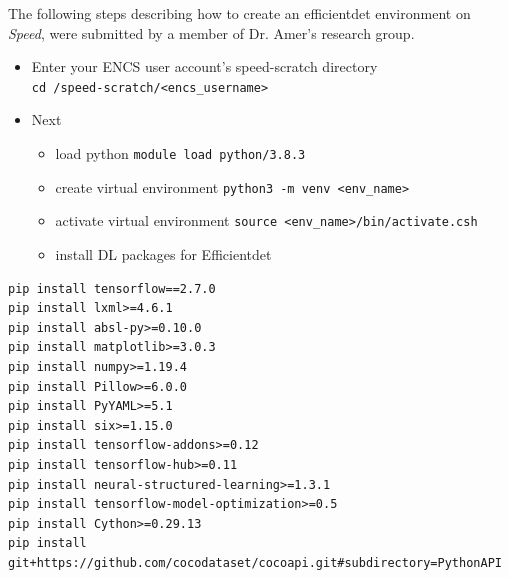 The following steps describing how to create an efficientdet environment on
\emph{Speed}, were submitted by a member of Dr. Amer's research group.

\begin{itemize}
    \item 
    Enter your ENCS user account's speed-scratch directory\\ 
    \verb!cd /speed-scratch/<encs_username>!
    \item
		Next
		\begin{itemize}
			\item 
    load python \verb!module load python/3.8.3!
			\item 
    create virtual environment \verb!python3 -m venv <env_name>!
			\item 
    activate virtual environment \verb!source <env_name>/bin/activate.csh!
			\item 
    install DL packages for Efficientdet
		\end{itemize}
\end{itemize}
\small
\begin{verbatim}
pip install tensorflow==2.7.0
pip install lxml>=4.6.1
pip install absl-py>=0.10.0
pip install matplotlib>=3.0.3
pip install numpy>=1.19.4
pip install Pillow>=6.0.0
pip install PyYAML>=5.1
pip install six>=1.15.0
pip install tensorflow-addons>=0.12
pip install tensorflow-hub>=0.11
pip install neural-structured-learning>=1.3.1
pip install tensorflow-model-optimization>=0.5
pip install Cython>=0.29.13
pip install git+https://github.com/cocodataset/cocoapi.git#subdirectory=PythonAPI
\end{verbatim}
\normalsize